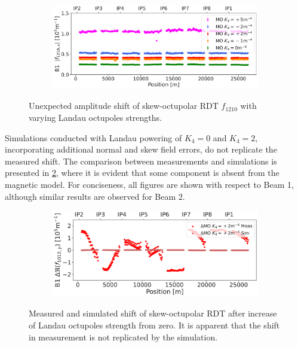 
\begin{figure}[!htb]
    \centering
    \begin{subfigure}{0.8\textwidth}
        \includegraphics[width=\textwidth]{./images/skew_octupoles/f1210_AMP_all_measurements.pdf}
    \end{subfigure}
    \caption{Unexpected amplitude shift of skew-octupolar RDT $f_{1210}$ with varying Landau
    octupoles strengths.}
    \label{fig:skew_octupolar:mo_different_levels_meas}
\end{figure}

Simulations conducted with Landau powering of $K_4 = 0$ and $K_4 = 2$, incorporating additional
normal and skew field errors, do not replicate the measured shift. The comparison between
measurements and simulations is presented in \cref{fig:skew_octupolar:mo_meas_vs_sim_+2}, where it
is evident that some component is absent from the magnetic model. For conciseness, all figures are
shown with respect to Beam 1, although similar results are observed for Beam 2.

\begin{figure}[!htb]
    \centering
    \begin{subfigure}{0.8\textwidth}
        \includegraphics[width=\textwidth]{./images/skew_octupoles/f1012_meas_vs_sim_0shift.pdf}
    \end{subfigure}
    \caption{Measured and simulated shift of skew-octupolar RDT after increase of Landau octupoles
    strength from zero. It is apparent that the shift in measurement is not replicated by the
    simulation.}
    \label{fig:skew_octupolar:mo_meas_vs_sim_+2}
\end{figure}



